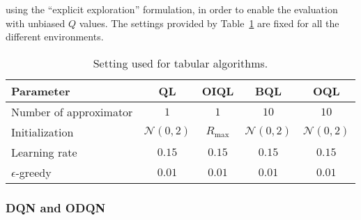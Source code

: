 using the ``explicit exploration'' formulation, in order to enable the evaluation with unbiased $Q$ values.
The settings provided by Table~\ref{tabularsetting} are fixed for all the different environments.
\begin{table}[h]
\begin{tabular}{ l c c c c }
	\textbf{Parameter} & \textbf{QL} & \textbf{OIQL} & \textbf{BQL} & \textbf{OQL}  \\
	\hline
	Number of approximator & $1$ & $1$ & $10$ & $10$  \\ 
	Initialization & $\mathcal{N}(0,2)$ & $R_{\max}$ & $\mathcal{N}(0,2)$& $\mathcal{N}(0,2)$ \\ 
	Learning rate & $0.15$ & $0.15$ & $0.15$ & $0.15$  \\   
	$\epsilon$-greedy & $0.01$ & $0.01$ & $0.01$ & $0.01$ 
\end{tabular}
\caption{Setting used for tabular algorithms.\label{tabularsetting}}
\end{table}
\vspace{1em}

\subsubsection{DQN and ODQN}

